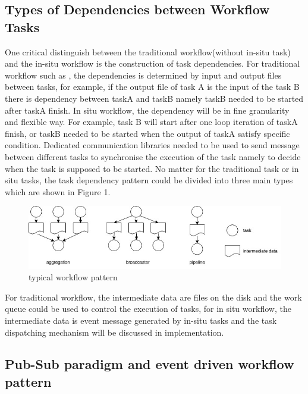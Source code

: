 \subsection{Types of Dependencies between Workflow Tasks}
One critical distinguish between the traditional workflow(without in-situ task) and the in-situ workflow is the construction of task dependencies. For traditional workflow such as \cite{albrecht2012makeflow}, the dependencies is determined by input and output files between tasks, for example, if the output file of task A is the input of the task B there is dependency between taskA and taskB namely taskB needed to be started after taskA finish.  In situ workflow, the dependency will be in fine granularity and flexible way.  For example, task B will start after one loop iteration of taskA finish, or taskB needed to be started when the output of taskA satisfy specific condition. Dedicated communication libraries needed to be used to send message between different tasks to  synchronise the execution of the task namely to decide when the task is supposed to be started. No matter for the traditional task or in situ tasks, the task dependency pattern could be divided into three main types \cite{albrecht2012makeflow,bharathi2008characterization} which are shown in Figure 1. 
\begin{figure} 
\centering
\includegraphics[width=.8\linewidth]{./figure/taskpattern.jpg}
\caption{typical workflow pattern}
 \label{fg:state}
\end{figure} 

For traditional workflow, the intermediate data are files on the disk and the work queue\cite{albrecht2012makeflow} could be used to control the execution of tasks,  for in situ workflow, the intermediate data is event message generated by in-situ tasks and the task dispatching mechanism will be discussed in implementation.

\subsection{Pub-Sub paradigm and event driven workflow pattern}

